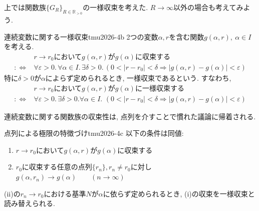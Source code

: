 \documentclass[titlepage]{jsarticle}
\numberwithin{equation}{section}
\newcommand{\R}{\mathbb{R}}%
\begin{document}
上では関数族$\{G_R\}_{R \in \R_{>0}}$の一様収束を考えた. $R \to \infty$以外の場合も考えてみよう.
\begin{dfn}{連続変数に関する一様収束}{tmu2026-4b}
2つの変数$\alpha, r$を含む関数$g(\alpha, r),\:\alpha \in I$を考える.
\begin{align*}
&r \to r_0\text{において}g(\alpha, r)\text{が}g(\alpha)\text{に収束する}\\
:\Longleftrightarrow & \forall \varepsilon >0.\,\forall \alpha \in I.\, \exists \delta>0.\, \left(0 < |r - r_0| < \delta \Rightarrow |g(\alpha,r) - g(\alpha) | < \varepsilon \right)
\end{align*}
特に$\delta > 0$が$\alpha$によらず定められるとき, 一様収束であるという. すなわち,
\begin{align*}
&r \to r_0\text{において}g(\alpha, r)\text{が}g(\alpha)\text{に一様収束する}\\
:\Longleftrightarrow & \forall \varepsilon >0.\,\exists \delta>0.\forall \alpha \in I.\, \, \left(0 < |r - r_0| < \delta \Rightarrow |g(\alpha,r) - g(\alpha) | < \varepsilon \right)
\end{align*}
\end{dfn}
連続変数に関する関数族の収束性は, 点列を介すことで慣れた議論に帰着される.
\begin{thm}{点列による極限の特徴づけ}{tmu2026-4c}
以下の条件は同値:
\begin{enumerate}
\item[(i)]$r \to r_0$において$g(\alpha, r)$が$g(\alpha)$に収束する
\item[(ii)]$r_0$に収束する任意の点列$\{r_n\}, r_n \ne r_0$に対し$g(\alpha, r_n) \to g(\alpha)\qquad(n \to \infty)$
\end{enumerate}
(ii)の$r_n \to r_0$における基準$N$が$\alpha$に依らず定められるとき, (i)の収束を一様収束と読み替えられる.
\end{thm}
\end{document}
